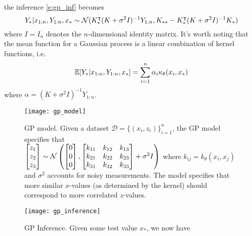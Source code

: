 the inference \eqref{e:gp_inf} becomes
\begin{equation} \label{e:gp_inf_noisey}
    Y_*|x_{1:n},Y_{1:n}, x_*
    \sim \mathcal{N}(K_*^\intercal (K+\sigma^2 I)^{-1} Y_{1:n}, K_{**} - K_*^\intercal (K+\sigma^2 I)^{-1} K_*)
\end{equation}
where $I=I_n$ denotes the $n$-dimensional identity matrix.  It's worth noting that the mean function for a Gaussian process is a linear combination of kernel functions, i.e.
\begin{equation}
    \operatorname{\mathbb{E}}[Y_*|x_{1:n},Y_{1:n}, x_*] = \sum_{i=1}^n \alpha_i \kappa_\theta(x_i,x_*)
\end{equation}
where $\alpha =(K+\sigma^2 I)^{-1} Y_{1:n}$.

\begin{figure}[h]
\begin{minipage}[t]{.45\textwidth}
\begin{center}
\texttt{[image: gp\_model]}
\end{center}
\caption[Gaussian Process Model]{GP model. Given a dataset ${\mathcal{D} = \{(x_i,z_i)\}_{i=1}^n}$, the GP model specifies that \\
$\begin{bmatrix} z_1 \\ z_2 \\ z_3 \end{bmatrix} 
\sim \mathcal{N}\left(\begin{bmatrix} 0 \\ 0 \\ 0 \end{bmatrix}, \begin{bmatrix} k_{11} & k_{12} & k_{13} \\ k_{21} & k_{22} & k_{23} \\ k_{31} & k_{32} & k_{33} \end{bmatrix} + \sigma^2 I \right)$
where $k_{ij} = k_\theta(x_i,x_j)$ and $\sigma^2$ accounts for noisy measurements.  The model specifies that more similar $x$-values (as determined by the kernel) should correspond to more correlated $z$-values.
}
\end{minipage}%
\hfill
\begin{minipage}[t]{.45\textwidth}
\begin{center}
\texttt{[image: gp\_inference]}
\end{center}
\caption[Gaussian Process Inference]{GP Inference. Given some test value $x_*$, we now have\\
}
\end{minipage}
\end{figure}

